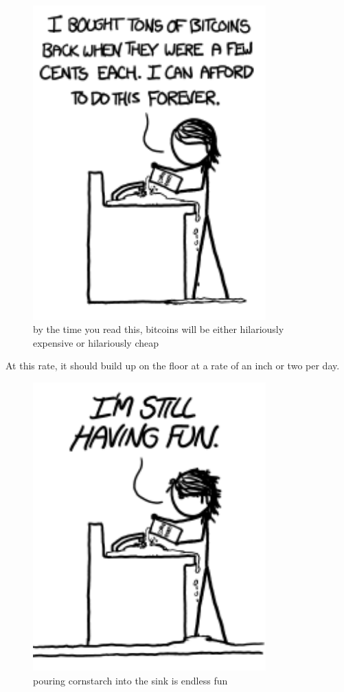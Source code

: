 \begin{figure}[!htbp]
\centering
\includegraphics[scale=0.5, max width=0.8\textwidth]{imgs/a/36/cornstarch_bitcoins.png}
\caption{by the time you read this, bitcoins will be either hilariously expensive or hilariously cheap}
\end{figure}

{At this rate, it should build up on the floor at a rate of an inch or two per day.}

\begin{figure}[!htbp]
\centering
\includegraphics[scale=0.5, max width=0.8\textwidth]{imgs/a/36/cornstarch_fun.png}
\caption{pouring cornstarch into the sink is endless fun}
\end{figure}

